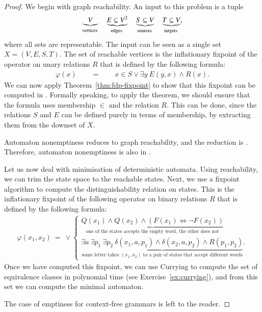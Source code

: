 \begin{proof}
    We  begin with graph reachability. An input to this problem is a tuple 
    \begin{align*}
    \myunderbrace{V}{vertices}
    \quad \myunderbrace{E \subseteq V^2}{edges}
    \quad \myunderbrace{S \subseteq V}{sources}
    \quad \myunderbrace{T \subseteq V}{targets},
    \end{align*}
where all sets are representable. The input can be seen as a single set $X = (V,E,S,T)$. The set of reachable vertices is the inflationary fixpoint of the  operator on unary relations $R$ that is defined by the following formula:
\begin{align*}
\varphi(x) 
\qquad = \qquad x \in S \lor \exists y \ E(y,x) \land R(x).
\end{align*}
We can now apply Theorem~\ref{thm:fdp-fixpoint} to show that this fixpoint can be computed in \fdp. Formally speaking, to apply the theorem, we should ensure that  the formula  uses membership $\in$ and the relation $R$. This  can be done, since the relations $S$ and $E$ can be defined purely in terms of membership, by extracting them from the downset of $X$. 

Automaton nonemptiness reduces to graph reachability, and the reduction is \fdp. Therefore, automaton nonemptiness is also in \fdp. 

Let us now deal with minimisation of deterministic automata. Using reachability, we can trim the state space to the reachable states. Next, we use a fixpoint algorithm to compute the distinguishability relation on states. This is the inflationary fixpoint of the following operator on binary relations $R$ that is defined by the following formula: 
 \begin{align*}
 \varphi(x_1,x_2) \ = \ \lor\! \begin{cases}
 \underbrace{Q(x_1) \land Q(x_2) \land (F(x_1) \Leftrightarrow \neg F(x_2))}_{\text{one of the states accepts the empty word, the other does not}}\\
 \underbrace{\exists a\ \exists p_1\ \exists p_2\ \delta(x_1,a,p_1)\land \delta(x_2,a,p_2)\land R(p_1,p_2)}_{\text{some letter takes $(x_1,x_2)$ to a pair of states that accept different words}}.
 \end{cases}
 \end{align*}
 Once we have computed this fixpoint, we can use Currying to compute the set of equivalence classes in polynomial time (see Exercise~\ref{ex:currying}), and from this set we can compute the minimal automaton.

 The case of emptiness for context-free grammars is left to the reader. 
\end{proof} 








